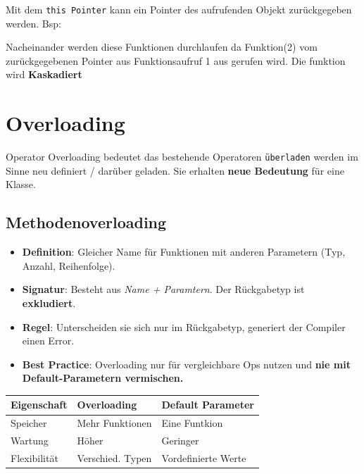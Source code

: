 Mit dem \texttt{this Pointer} kann ein Pointer des aufrufenden Objekt zurückgegeben werden.
Bsp:



Nacheinander werden diese Funktionen durchlaufen da Funktion(2) vom zurückgegebenen Pointer aus Funktionsaufruf 1 aus gerufen wird.
Die funktion wird \textbf{Kaskadiert}


\section{Overloading}

Operator Overloading bedeutet das bestehende Operatoren \texttt{überladen} werden im Sinne neu definiert / darüber geladen.
Sie erhalten \textbf{neue Bedeutung} für eine Klasse.


\subsection{Methodenoverloading}
\begin{itemize}
    \item \textbf{Definition}: Gleicher Name für Funktionen mit anderen Parametern (Typ, Anzahl, Reihenfolge).
    \item \textbf{Signatur}: Besteht aus \textit{Name + Paramtern}. Der Rückgabetyp ist \textbf{exkludiert}.
    \item \textbf{Regel}: Unterscheiden sie sich nur im Rückgabetyp, generiert der Compiler einen Error.
    \item \textbf{Best Practice}: Overloading nur für vergleichbare Ops nutzen und \textbf{nie mit Default-Parametern vermischen.}
\end{itemize}

\begin{center}
    
    \begin{tabular}{lll}
        \toprule
        \textbf{Eigenschaft} & \textbf{Overloading} & \textbf{Default Parameter} \\
        \midrule
        Speicher & Mehr Funktionen & Eine Funtkion \\
        Wartung & Höher & Geringer \\
        Flexibilität & Verschied. Typen & Vordefinierte Werte \\
  
        \bottomrule
    \end{tabular}
\end{center}

